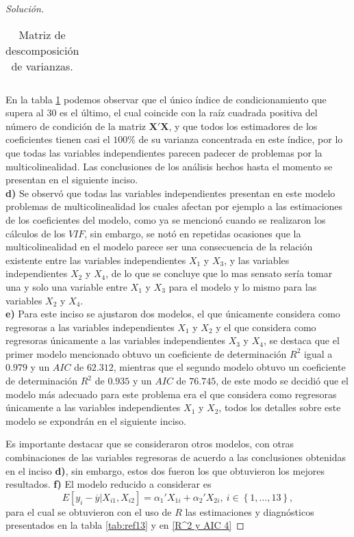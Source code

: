 \documentclass[10.5pt,notitlepage]{article}
\renewcommand{\qedsymbol}{$\blacksquare$}
\newenvironment{solucion}
  {\begin{proof}[Solución]}
  {\end{proof}}
\newcommand{\kis}[1]{\left\{ #1 \right\}}
\theoremstyle{plain}
\newenvironment{rem}
  {\pushQED{\qed}\renewcommand{\qedsymbol}{$\triangle$}\remarkex}
  {\popQED\endremarkex}
\begin{document}
\begin{solucion}
\begin{table}[H]
{\begin{tabular}{@{}l@{\hskip 0.3in}r@{\hskip 0.3in}r@{\hskip 0.3in}r@{\hskip 0.3in}r@{\hskip 0.3in}r@{}}
            \bottomrule
        \end{tabular}}
\caption{Matriz de descomposición de varianzas.}
\label{tab:ref12}
\end{table}
En la tabla \ref{tab:ref12} podemos observar que el único índice de condicionamiento que supera al \(30\) es el último, el cual coincide con la raíz cuadrada positiva del número de condición de la matriz \(\mathbf{X}'\mathbf{X}\), y que todos los estimadores de los coeficientes tienen casi el \(100\%\) de su varianza concentrada en este índice, por lo que todas las variables independientes parecen padecer de problemas por la multicolinealidad. Las conclusiones de los análisis hechos hasta el momento se presentan en el siguiente inciso. \\ 

\noindent \textbf{d)} Se observó que todas las variables independientes presentan en este modelo problemas de multicolinealidad los cuales afectan por ejemplo a las estimaciones de los coeficientes del modelo, como ya se mencionó cuando se realizaron los cálculos de los \(VIF\), sin embargo, se notó en repetidas ocasiones que la multicolinealidad en el modelo parece ser una consecuencia de la relación existente entre las variables independientes \(X_1\) y \(X_3\), y las variables independientes \(X_2\) y \(X_4\), de lo que se concluye que lo mas sensato sería tomar una y solo una variable entre \(X_1\) y \(X_3\) para el modelo y lo mismo para las variables \(X_2\) y \(X_4\).\\

\noindent \textbf{e)} Para este inciso se ajustaron dos modelos, el que únicamente considera como regresoras a las variables independientes \(X_1\) y \(X_2\) y el que considera como regresoras únicamente a las variables independientes \(X_3\) y \(X_4\), se destaca que el primer modelo mencionado obtuvo un coeficiente de determinación \(R^2\) igual a \(0.979\) y un \(AIC\) de \(62.312\), mientras que el segundo modelo obtuvo un coeficiente de determinación \(R^2\) de \(0.935\) y un \(AIC\) de \(76.745\), de este modo se decidió que el modelo más adecuado para este problema era el que considera como regresoras únicamente a las variables independientes \(X_1\) y \(X_2\), todos los detalles sobre este modelo se expondrán en el siguiente inciso. 

\begin{rem}
Es importante destacar que se consideraron otros modelos, con otras combinaciones de las variables regresoras de acuerdo a las conclusiones obtenidas en el inciso \textbf{d)}, sin embargo,  estos dos fueron los que obtuvieron los mejores resultados.
\end{rem}
\noindent \textbf{f)}  El modelo reducido a considerar es 
\begin{equation}\label{reducido2}
   E[y_{i} - \overline{y}| X_{i1},X_{i2}] =  \alpha_{1}' X_{1i} + \alpha_{2}' X_{2i}, \ i \in \kis{1, \hdots, 13},
\end{equation}
para el cual se obtuvieron con el uso de \(R\) las estimaciones y diagnósticos presentados en la tabla \ref{tab:ref13} y en \eqref{R^2 y AIC 4}


\end{solucion}
\end{document}
